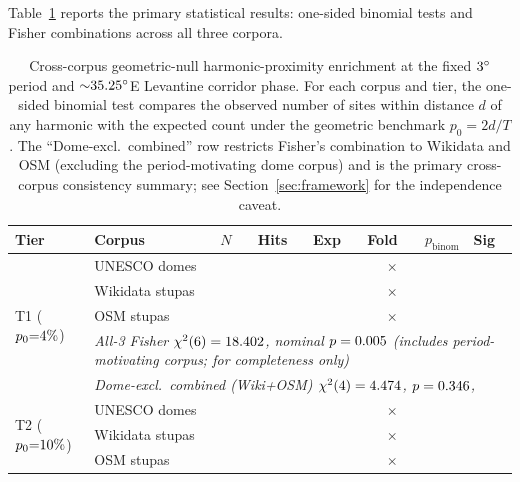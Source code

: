 \documentclass[12pt,a4paper]{article}
\newcommand{\degr}{\ifmmode^\circ\else\textdegree{}\fi}
\begin{document}
Table~\ref{tab:cross_corpus_geo} reports the primary statistical
results: one-sided binomial tests and Fisher combinations across all
three corpora.

\begin{table}[ht]
\centering
\caption{Cross-corpus geometric-null harmonic-proximity enrichment at
the fixed $3\degr$ period and ${\sim}35.25\degr$E Levantine corridor
phase. For each corpus and tier, the one-sided binomial test compares
the observed number of sites within distance $d$ of any harmonic with
the expected count under the geometric benchmark $p_0 = 2d/T$.
The ``Dome-excl.\ combined'' row restricts Fisher's combination to
Wikidata and OSM (excluding the period-motivating dome corpus) and is the
primary cross-corpus consistency summary; see Section~\ref{sec:framework}
for the independence caveat.}
\label{tab:cross_corpus_geo}
\small
\begin{tabular}{llrrrrrl}
\toprule
Tier & Corpus & $N$ & Hits & Exp & Fold & $p_\mathrm{binom}$ & Sig \\
\midrule
\multirow{5}{*}{T1 ($p_0{=}4\%{}$)}
  & UNESCO domes    & \geoDomeAppN{} & \geoDomeAppHits{} & \geoDomeAppExp{} & \geoDomeAppEnr{}$\times$ & \geoDomeAppP{} & \geoDomeAppSig{} \\
  & Wikidata stupas & \geoWikiAppN{} & \geoWikiAppHits{} & \geoWikiAppExp{} & \geoWikiAppEnr{}$\times$ & \geoWikiAppP{} & \geoWikiAppSig{} \\
  & OSM stupas      & \geoOsmAppN{}  & \geoOsmAppHits{}  & \geoOsmAppExp{}  & \geoOsmAppEnr{}$\times$  & \geoOsmAppP{}  & \geoOsmAppSig{} \\
  & \multicolumn{7}{l}{\textit{All-3 Fisher $\chi^2(6) = 18.402{}$, nominal $p = 0.005{}$ (includes period-motivating corpus; for completeness only)}} \\
  & \multicolumn{7}{l}{\textit{Dome-excl.\ combined (Wiki+OSM) $\chi^2(4) = 4.474{}$, $p = 0.346{}$, \geoFisherNcAppSig{}}} \\
\midrule
\multirow{5}{*}{T2 ($p_0{=}10\%{}$)}
  & UNESCO domes    & \geoDomeApN{}  & \geoDomeApHits{}  & \geoDomeApExp{}  & \geoDomeApEnr{}$\times$  & \geoDomeApP{}  & \geoDomeApSig{} \\
  & Wikidata stupas & \geoWikiApN{}  & \geoWikiApHits{}  & \geoWikiApExp{}  & \geoWikiApEnr{}$\times$  & \geoWikiApP{}  & \geoWikiApSig{} \\
  & OSM stupas      & \geoOsmApN{}   & \geoOsmApHits{}   & \geoOsmApExp{}   & \geoOsmApEnr{}$\times$   & \geoOsmApP{}   & \geoOsmApSig{} \\

\end{tabular}
\end{table}
\end{document}
